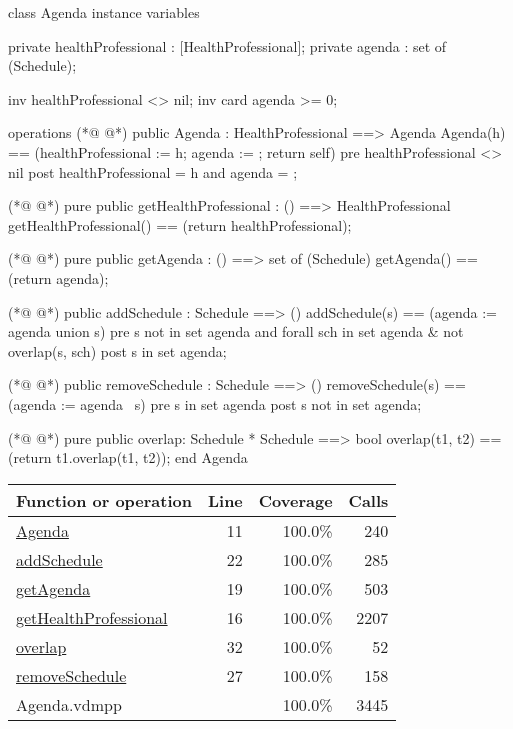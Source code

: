 \begin{vdmpp}[breaklines=true]
class Agenda
instance variables

private healthProfessional : [HealthProfessional];
private agenda : set of (Schedule);

inv healthProfessional <> nil;
inv card agenda >= 0;

operations
(*@
\label{Agenda:11}
@*)
 public Agenda : HealthProfessional ==> Agenda
  Agenda(h) == (healthProfessional := h; agenda := {}; return self)
 pre healthProfessional <> nil
 post healthProfessional = h and agenda = {};
 
(*@
\label{getHealthProfessional:16}
@*)
 pure public getHealthProfessional : () ==> HealthProfessional
  getHealthProfessional() == (return healthProfessional);
 
(*@
\label{getAgenda:19}
@*)
 pure public getAgenda : () ==> set of (Schedule)
  getAgenda() == (return agenda);
 
(*@
\label{addSchedule:22}
@*)
 public addSchedule : Schedule ==> ()
  addSchedule(s) == (agenda := agenda union {s})
 pre s not in set agenda and forall sch in set agenda & not overlap(s, sch)
 post s in set agenda;
 
(*@
\label{removeSchedule:27}
@*)
 public removeSchedule : Schedule ==> ()
  removeSchedule(s) == (agenda := agenda \ {s})
 pre s in set agenda
 post s not in set agenda;
 
(*@
\label{overlap:32}
@*)
 pure public overlap: Schedule * Schedule ==> bool
  overlap(t1, t2) == (return t1.overlap(t1, t2));
end Agenda
\end{vdmpp}
\bigskip
\begin{longtable}{|l|r|r|r|}
\hline
Function or operation & Line & Coverage & Calls \\
\hline
\hline
\hyperref[Agenda:11]{Agenda} & 11&100.0\% & 240 \\
\hline
\hyperref[addSchedule:22]{addSchedule} & 22&100.0\% & 285 \\
\hline
\hyperref[getAgenda:19]{getAgenda} & 19&100.0\% & 503 \\
\hline
\hyperref[getHealthProfessional:16]{getHealthProfessional} & 16&100.0\% & 2207 \\
\hline
\hyperref[overlap:32]{overlap} & 32&100.0\% & 52 \\
\hline
\hyperref[removeSchedule:27]{removeSchedule} & 27&100.0\% & 158 \\
\hline
\hline
Agenda.vdmpp & & 100.0\% & 3445 \\
\hline
\end{longtable}

